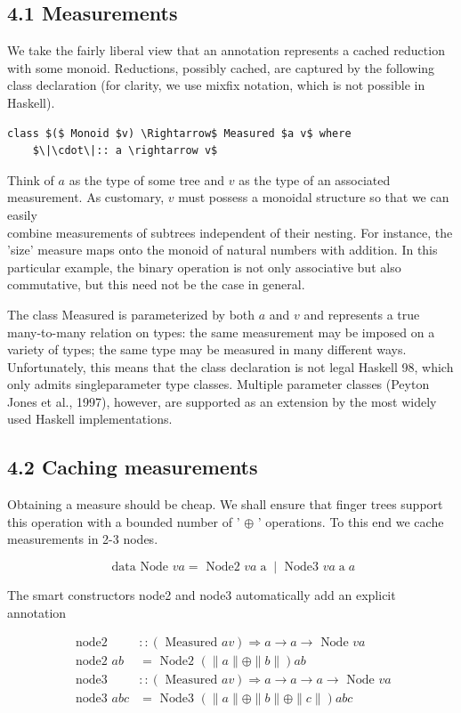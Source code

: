 \documentclass[10pt]{article}
\begin{document}
\subsection*{4.1 Measurements}
We take the fairly liberal view that an annotation represents a cached reduction with some monoid. Reductions, possibly cached, are captured by the following class declaration (for clarity, we use mixfix notation, which is not possible in Haskell).

\begin{verbatim}
class $($ Monoid $v) \Rightarrow$ Measured $a v$ where
    $\|\cdot\|:: a \rightarrow v$
\end{verbatim}

Think of $a$ as the type of some tree and $v$ as the type of an associated measurement. As customary, $v$ must possess a monoidal structure so that we can easily\\
combine measurements of subtrees independent of their nesting. For instance, the 'size' measure maps onto the monoid of natural numbers with addition. In this particular example, the binary operation is not only associative but also commutative, but this need not be the case in general.

The class Measured is parameterized by both $a$ and $v$ and represents a true many-to-many relation on types: the same measurement may be imposed on a variety of types; the same type may be measured in many different ways. Unfortunately, this means that the class declaration is not legal Haskell 98, which only admits singleparameter type classes. Multiple parameter classes (Peyton Jones et al., 1997), however, are supported as an extension by the most widely used Haskell implementations.

\subsection*{4.2 Caching measurements}
Obtaining a measure should be cheap. We shall ensure that finger trees support this operation with a bounded number of ' $\oplus$ ' operations. To this end we cache measurements in 2-3 nodes.

$$
\text { data Node } v a=\text { Node2 } v a \operatorname{a} \mid \text { Node3 } v a \operatorname{a} a
$$

The smart constructors node2 and node3 automatically add an explicit annotation

$$
\begin{array}{ll}
\text { node2 } & ::(\text { Measured } a v) \Rightarrow a \rightarrow a \rightarrow \text { Node } v a \\
\text { node2 } a b & =\text { Node2 }(\|a\| \oplus\|b\|) a b \\
\text { node3 } & ::(\text { Measured } a v) \Rightarrow a \rightarrow a \rightarrow a \rightarrow \text { Node } v a \\
\text { node3 } a b c & =\text { Node3 }(\|a\| \oplus\|b\| \oplus\|c\|) a b c
\end{array}
$$
\end{document}
